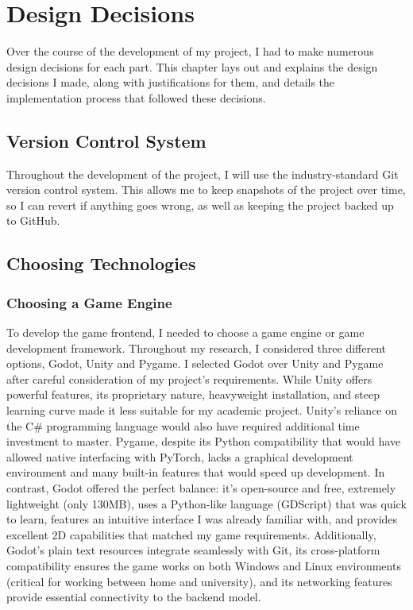 \chapter{Design Decisions}

Over the course of the development of my project, I had to make numerous design decisions for each part. 
This chapter lays out and explains the design decisions I made, along with justifications for them, and details the implementation process that followed these decisions.

\section{Version Control System}

Throughout the development of the project, I will use the industry-standard Git version control system. 
This allows me to keep snapshots of the project over time, so I can revert if anything goes wrong, as well as keeping the project backed up to GitHub.

\section{Choosing Technologies}

\subsection{Choosing a Game Engine}

To develop the game frontend, I needed to choose a game engine or game development framework. Throughout my research, I considered three different options, Godot, Unity and Pygame.
I selected Godot over Unity and Pygame after careful consideration of my project's requirements. 
While Unity offers powerful features, its proprietary nature, heavyweight installation, and steep learning curve made it less suitable for my academic project. 
Unity's reliance on the C\# programming language would also have required additional time investment to master. 
Pygame, despite its Python compatibility that would have allowed native interfacing with PyTorch, lacks a graphical development environment and many built-in features that would speed up development. 
In contrast, Godot offered the perfect balance: it's open-source and free, extremely lightweight (only 130MB), uses a Python-like language (GDScript) that was quick to learn, features an intuitive interface I was already familiar with, and provides excellent 2D capabilities that matched my game requirements.
Additionally, Godot's plain text resources integrate seamlessly with Git, its cross-platform compatibility ensures the game works on both Windows and Linux environments (critical for working between home and university), and its networking features provide essential connectivity to the backend model.

